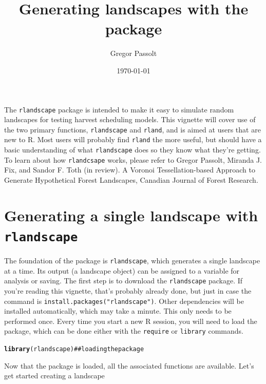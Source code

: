 \documentclass{article}\usepackage{graphicx, color}
\author{Gregor Passolt}
\title{Generating landscapes with the \code{rlandsacpe} package}
\date{\today}
\makeatletter
\newcommand{\hlfunctioncall}[1]{\textcolor[rgb]{0.501960784313725,0,0.329411764705882}{\textbf{#1}}}%
\newcommand{\hlcomment}[1]{\textcolor[rgb]{0.180392156862745,0.6,0.341176470588235}{#1}}%
\newenvironment{kframe}{%
 \def\at@end@of@kframe{}%
 \ifinner\ifhmode%
  \def\at@end@of@kframe{\end{minipage}}%
  \begin{minipage}{\columnwidth}%
 \fi\fi%
 \def\FrameCommand##1{\hskip\@totalleftmargin \hskip-\fboxsep
 \colorbox{shadecolor}{##1}\hskip-\fboxsep
     \hskip-\linewidth \hskip-\@totalleftmargin \hskip\columnwidth}%
 \MakeFramed {\advance\hsize-\width
   \@totalleftmargin\z@ \linewidth\hsize
   \@setminipage}}%
 {\par\unskip\endMakeFramed%
 \at@end@of@kframe}
\newenvironment{knitrout}{}{} %
\newcommand{\code}[1]{{\tt #1}}
\makeatother
\begin{document}
\maketitle
\tableofcontents

The \code{rlandscape} package is intended to make it easy to simulate random landscapes
for testing harvest scheduling models.
This vignette will cover use of the two primary functions,
\code{rlandscape} and \code{rland}, and is aimed at users that are new to R.
Most users will probably find \code{rland} the more useful,
but should have a basic understanding of what \code{rlandscape} does so they know what they're getting.
To learn about how \code{rlandcsape} works, please refer to
Gregor Passolt, Miranda J. Fix, and Sandor F. Toth (in review).
A Voronoi Tessellation-based Approach to Generate Hypothetical Forest Landscapes,
Canadian Journal of Forest Research.

\section{Generating a single landscape with \code{rlandscape}}

The foundation of the package is \code{rlandscape}, which generates a single landscape at a time.
Its output (a landscape object) can be assigned to a variable for analysis or saving.
The first step is to download the \code{rlandscape} package.
If you're reading this vignette, that's probably already done, but just in case the command is
\verb|install.packages("rlandscape")|.
Other dependencies will be installed automatically, which may take a minute.
This only needs to be performed once.
Every time you start a new R session, you will need to load the package, which can be done
either with the \verb|require| or \verb|library| commands.

\begin{knitrout}
\color{fgcolor}\begin{kframe}
\begin{alltt}
\hlfunctioncall{library}(rlandscape)  \hlcomment{## loading the package}
\end{alltt}
\end{kframe}
\end{knitrout}


Now that the package is loaded, all the associated functions are available.
Let's get started creating a landscape
\end{document}
